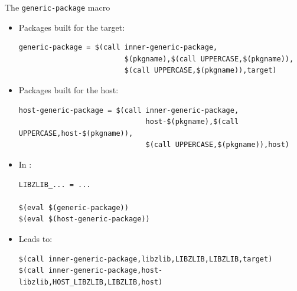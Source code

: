 \begin{frame}[fragile]{The {\tt generic-package} macro}

\begin{itemize}
\item Packages built for the target:
\begin{block}{}
\begin{verbatim}
generic-package = $(call inner-generic-package,
                         $(pkgname),$(call UPPERCASE,$(pkgname)),
                         $(call UPPERCASE,$(pkgname)),target)
\end{verbatim}
\end{block}

\item Packages built for the host:
\begin{block}{}
\begin{verbatim}
host-generic-package = $(call inner-generic-package,
                              host-$(pkgname),$(call UPPERCASE,host-$(pkgname)),
                              $(call UPPERCASE,$(pkgname)),host)
\end{verbatim}
\end{block}

\item In :
\begin{block}{}
\begin{verbatim}
LIBZLIB_... = ...

$(eval $(generic-package))
$(eval $(host-generic-package))
\end{verbatim}
\end{block}

\item Leads to:
\begin{block}{}
\begin{verbatim}
$(call inner-generic-package,libzlib,LIBZLIB,LIBZLIB,target)
$(call inner-generic-package,host-libzlib,HOST_LIBZLIB,LIBZLIB,host)
\end{verbatim}
\end{block}

\end{itemize}

\end{frame}

